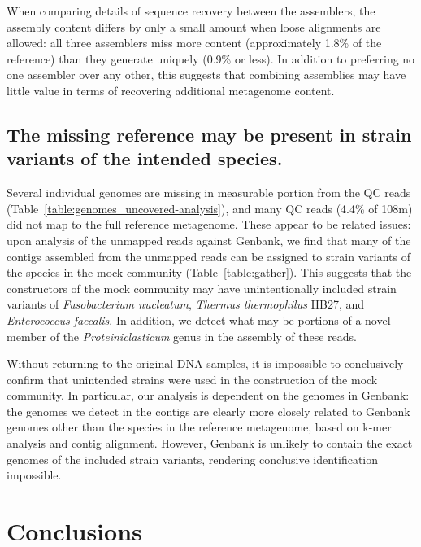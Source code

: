\documentclass[11pt]{article}
\begin{document}


When comparing details of sequence recovery between the assemblers,
the assembly content differs by only a small amount when loose
alignments are allowed: all three assemblers miss more content
(approximately 1.8\% of the reference) than they generate uniquely
(0.9\% or less).  In addition to preferring no one assembler over any
other, this suggests that combining assemblies may have little value
in terms of recovering additional metagenome content.


\subsection*{The missing reference may be present in strain variants of the intended species.}

Several individual genomes are missing in measurable portion from the
QC reads (Table~\ref{table:genomes_uncovered-analysis}), and many QC
reads (4.4\% of 108m) did not map to the full reference metagenome.
These appear to be related issues: upon analysis of the unmapped reads
against Genbank, we find that many of the contigs assembled from the
unmapped reads can be assigned to strain variants of the species in
the mock community (Table~\ref{table:gather}).  This suggests that the
constructors of the mock community may have unintentionally included
strain variants of {\em Fusobacterium nucleatum}, {\em Thermus
  thermophilus} HB27, and {\em Enterococcus faecalis}.  In addition,
we detect what may be portions of a novel member of the {\em
  Proteiniclasticum} genus in the assembly of these reads.

Without returning to the original DNA samples, it is impossible to
conclusively confirm that unintended strains were used in the
construction of the mock community.  In particular, our analysis is
dependent on the genomes in Genbank: the genomes we detect in the
contigs are clearly more closely related to Genbank genomes other than
the species in the reference metagenome, based on k-mer analysis and
contig alignment.  However, Genbank is unlikely to contain the exact
genomes of the included strain variants, rendering conclusive
identification impossible.

\section*{Conclusions}
\end{document}

